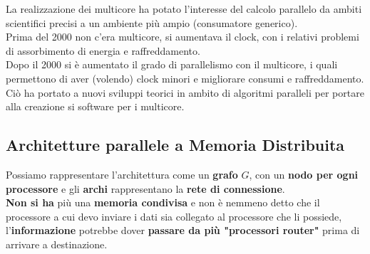	La realizzazione dei multicore ha potato l'interesse del calcolo parallelo da ambiti scientifici precisi a un ambiente più ampio (consumatore generico).\\
	
	Prima del 2000 non c'era multicore, si aumentava il clock, con i relativi problemi di assorbimento di energia e raffreddamento.\\
	Dopo il 2000 si è aumentato il grado di parallelismo con il multicore, i quali permettono di aver (volendo) clock minori e migliorare consumi e raffreddamento.\\
	
	Ciò ha portato a nuovi sviluppi teorici in ambito di algoritmi paralleli per portare alla creazione si software per i multicore.\\
	
	\newpage
	
	\subsection{Architetture parallele a Memoria Distribuita}
	Possiamo rappresentare l'architettura come un \textbf{grafo} $G$, con un \textbf{nodo per ogni processore} e gli \textbf{archi} rappresentano la \textbf{rete di connessione}. \\
	
	\textbf{Non si ha} più una \textbf{memoria condivisa} e non è nemmeno detto che il processore a cui devo inviare i dati sia collegato al processore che li possiede, l'\textbf{informazione} potrebbe dover \textbf{passare da più "processori router"} prima di arrivare a destinazione.\\
	
